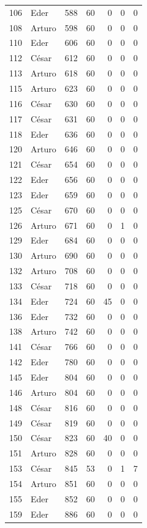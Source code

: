 \begin{longtable}{llrrrrr}
106 & Eder & 588 & 60 & 0 & 0 & 0 \\
108 & Arturo & 598 & 60 & 0 & 0 & 0 \\
110 & Eder & 606 & 60 & 0 & 0 & 0 \\
112 & César & 612 & 60 & 0 & 0 & 0 \\
113 & Arturo & 618 & 60 & 0 & 0 & 0 \\
115 & Arturo & 623 & 60 & 0 & 0 & 0 \\
116 & César & 630 & 60 & 0 & 0 & 0 \\
117 & César & 631 & 60 & 0 & 0 & 0 \\
118 & Eder & 636 & 60 & 0 & 0 & 0 \\
120 & Arturo & 646 & 60 & 0 & 0 & 0 \\
121 & César & 654 & 60 & 0 & 0 & 0 \\
122 & Eder & 656 & 60 & 0 & 0 & 0 \\
123 & Eder & 659 & 60 & 0 & 0 & 0 \\
125 & César & 670 & 60 & 0 & 0 & 0 \\
126 & Arturo & 671 & 60 & 0 & 1 & 0 \\
129 & Eder & 684 & 60 & 0 & 0 & 0 \\
130 & Arturo & 690 & 60 & 0 & 0 & 0 \\
132 & Arturo & 708 & 60 & 0 & 0 & 0 \\
133 & César & 718 & 60 & 0 & 0 & 0 \\
134 & Eder & 724 & 60 & 45 & 0 & 0 \\
136 & Eder & 732 & 60 & 0 & 0 & 0 \\
138 & Arturo & 742 & 60 & 0 & 0 & 0 \\
141 & César & 766 & 60 & 0 & 0 & 0 \\
142 & Eder & 780 & 60 & 0 & 0 & 0 \\
145 & Eder & 804 & 60 & 0 & 0 & 0 \\
146 & Arturo & 804 & 60 & 0 & 0 & 0 \\
148 & César & 816 & 60 & 0 & 0 & 0 \\
149 & César & 819 & 60 & 0 & 0 & 0 \\
150 & César & 823 & 60 & 40 & 0 & 0 \\
151 & Arturo & 828 & 60 & 0 & 0 & 0 \\
153 & César & 845 & 53 & 0 & 1 & 7 \\
154 & Arturo & 851 & 60 & 0 & 0 & 0 \\
155 & Eder & 852 & 60 & 0 & 0 & 0 \\
159 & Eder & 886 & 60 & 0 & 0 & 0 \\

\end{longtable}
